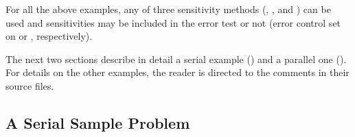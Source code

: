 For all the above examples, any of three sensitivity methods (, 
, and ) can be used and sensitivities may be 
included in the error test or not (error control set on  or ,
respectively).

The next two sections describe in detail a serial example () and
a parallel one (). For details on the other examples, the reader is
directed to the comments in their source files.

\subsection{A Serial Sample Problem}\label{ss:serial_fwd_ex}

